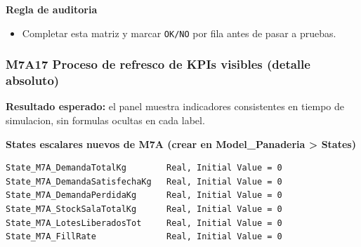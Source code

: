 \documentclass[11pt]{article}
\newcommand{\simio}[1]{\texttt{#1}}
\begin{document}
\textbf{Regla de auditoria}
\begin{itemize}
  \item Completar esta matriz y marcar \simio{OK/NO} por fila antes de pasar a pruebas.
\end{itemize}

\subsubsection{M7A17 Proceso de refresco de KPIs visibles (detalle absoluto)}
\textbf{Resultado esperado:} el panel muestra indicadores consistentes en tiempo de simulacion, sin formulas ocultas en cada label.

\textbf{States escalares nuevos de M7A (crear en Model\_Panaderia > States)}
\begin{lstlisting}[caption={States escalares de panel recomendados en M7A}]
State_M7A_DemandaTotalKg        Real, Initial Value = 0
State_M7A_DemandaSatisfechaKg   Real, Initial Value = 0
State_M7A_DemandaPerdidaKg      Real, Initial Value = 0
State_M7A_StockSalaTotalKg      Real, Initial Value = 0
State_M7A_LotesLiberadosTot     Real, Initial Value = 0
State_M7A_FillRate              Real, Initial Value = 0
\end{lstlisting}
\end{document}
